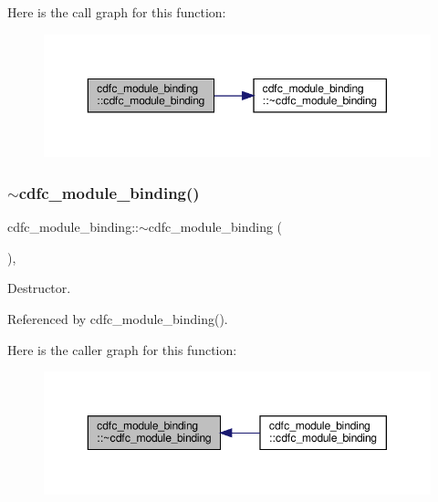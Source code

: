 Here is the call graph for this function\+:
\nopagebreak
\begin{figure}[H]
\begin{center}
\leavevmode
\includegraphics[width=350pt]{d9/dc4/classcdfc__module__binding_a045314febf16ce516460eb318641bfda_cgraph}
\end{center}
\end{figure}
\mbox{\label{classcdfc__module__binding_aa0fe288f9870d0e64dfe379618ad6855}} 
\subsubsection{\texorpdfstring{$\sim$cdfc\+\_\+module\+\_\+binding()}{~cdfc\_module\_binding()}}
{\footnotesize\ttfamily cdfc\+\_\+module\+\_\+binding\+::$\sim$cdfc\+\_\+module\+\_\+binding (\begin{DoxyParamCaption}{ }\end{DoxyParamCaption})\hspace{0.3cm}{\ttfamily [override]}, {\ttfamily [default]}}



Destructor. 



Referenced by cdfc\+\_\+module\+\_\+binding().

Here is the caller graph for this function\+:
\nopagebreak
\begin{figure}[H]
\begin{center}
\leavevmode
\includegraphics[width=350pt]{d9/dc4/classcdfc__module__binding_aa0fe288f9870d0e64dfe379618ad6855_icgraph}
\end{center}
\end{figure}



